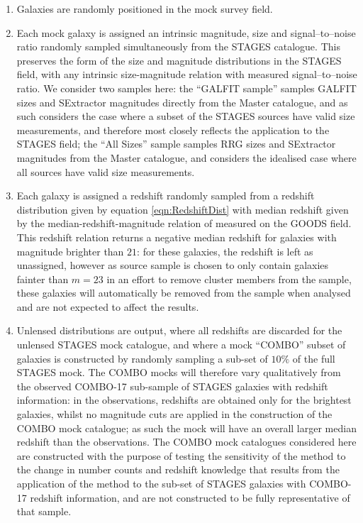 \documentclass[useAMS,usenatbib,times,letter,amssymb]{mn2e}
\begin{document}
\begin{enumerate}
\item{Galaxies are randomly positioned in the mock survey field.}
\item{Each mock galaxy is assigned an intrinsic magnitude, size and signal--to--noise ratio randomly sampled simultaneously from the STAGES catalogue. This preserves the form of the size and magnitude distributions in the STAGES field, with any intrinsic size-magnitude relation with measured signal--to--noise ratio. We consider two samples here: the ``GALFIT sample'' samples GALFIT sizes and SExtractor magnitudes directly from the Master catalogue, and as such considers the case where a subset of the STAGES sources have valid size measurements, and therefore most closely reflects the application to the STAGES field; the ``All Sizes'' sample samples RRG sizes and SExtractor magnitudes from the Master catalogue, and considers the idealised case where all sources have valid size measurements.}
\item{Each galaxy is assigned a redshift  randomly sampled from a redshift distribution given by equation \ref{eqn:RedshiftDist} with median redshift given by the median-redshift-magnitude relation of \cite{Schrabback:2007p2802} measured on the GOODS field. This redshift relation returns a negative median redshift for galaxies with magnitude brighter than $21$: for these galaxies, the redshift is left as unassigned, however as source sample is chosen to only contain galaxies fainter than $m = 23$ in an effort to remove cluster members from the sample, these galaxies will automatically be removed from the sample when analysed and are not expected to affect the results.}\label{Mock_Construction__Redshift_Assignation}
\item{Unlensed distributions are output, where all redshifts are discarded for the unlensed STAGES mock catalogue, and where a mock ``COMBO'' subset of galaxies is constructed by randomly sampling a sub-set of $10\%$ of the full STAGES mock. The COMBO mocks will therefore vary qualitatively from the observed COMBO-17 sub-sample of STAGES galaxies with redshift information: in the observations, redshifts are obtained only for the brightest galaxies, whilst no magnitude cuts are applied in the construction of the COMBO mock catalogue; as such the mock will have an overall larger median redshift than the observations. The COMBO mock catalogues considered here are constructed with the purpose of testing the sensitivity of the method to the change in number counts and redshift knowledge that results from the application of the method to the sub-set of STAGES galaxies with COMBO-17 redshift information, and are not constructed to be fully representative of that sample.}\label{Mock_Construction__UnlensedOutput}

\end{enumerate}
\end{document}
